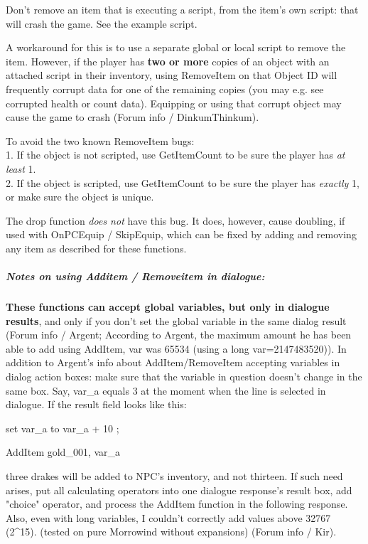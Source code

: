 \documentclass[
]{article}
\begin{document}
Don't remove an item that is executing a script, from the item's own
script: that will crash the game. See the example script.

A workaround for this is to use a separate global or local script to
remove the item. However, if the player has \textbf{two or more} copies
of an object with an attached script in their inventory, using
RemoveItem on that Object ID will frequently corrupt data for one of the
remaining copies (you may e.g. see corrupted health or count data).
Equipping or using that corrupt object may cause the game to crash
(Forum info / DinkumThinkum).

To avoid the two known RemoveItem bugs:\\
1. If the object is not scripted, use GetItemCount to be sure the player
has \emph{at least} 1.\\
2. If the object is scripted, use GetItemCount to be sure the player has
\emph{exactly} 1, or make sure the object is unique.

The drop function \emph{does not} have this bug. It does, however, cause
doubling, if used with OnPCEquip / SkipEquip, which can be fixed by
adding and removing any item as described for these functions.

\hypertarget{notes-on-using-additem-removeitem-in-dialogue}{%
\subparagraph{Notes on using Additem / Removeitem in
dialogue:}\label{notes-on-using-additem-removeitem-in-dialogue}}

\textbf{These functions can accept global variables, but only in
dialogue results}, and only if you don't set the global variable in the
same dialog result (Forum info / Argent; According to Argent, the
maximum amount he has been able to add using AddItem, var was 65534
(using a long var=2147483520)). In addition to Argent's info about
AddItem/RemoveItem accepting variables in dialog action boxes: make sure
that the variable in question doesn't change in the same box. Say,
var\_a equals 3 at the moment when the line is selected in dialogue. If
the result field looks like this:

set var\_a to var\_a + 10 ;

AddItem gold\_001, var\_a

three drakes will be added to NPC's inventory, and not thirteen. If such
need arises, put all calculating operators into one dialogue response's
result box, add "choice" operator, and process the AddItem function in
the following response. Also, even with long variables, I couldn't
correctly add values above 32767 (2\^{}15). (tested on pure Morrowind
without expansions) (Forum info / Kir).
\end{document}
